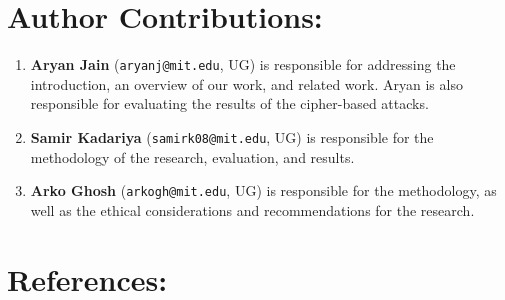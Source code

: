 \documentclass{article} %
\begin{document}
\section{Author Contributions:}
    \begin{enumerate}
        \item \textbf{Aryan Jain} (\texttt{aryanj@mit.edu}, UG) is responsible for addressing the introduction, an overview of our work, and related work. Aryan is also responsible for evaluating the results of the cipher-based attacks. 
        \item \textbf{Samir Kadariya} (\texttt{samirk08@mit.edu}, UG) is responsible for the methodology of the research, evaluation, and results. 
        \item \textbf{Arko Ghosh} (\texttt{arkogh@mit.edu}, UG) is responsible for the methodology, as well as the ethical considerations and recommendations for the research. 
    \end{enumerate}
    
\section{References:}
\end{document}
